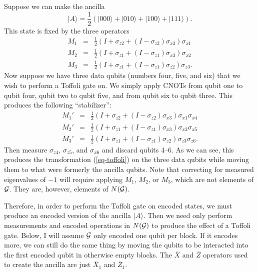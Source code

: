 \documentclass{report}
\newcommand{\G}{{\cal G}}
\newcommand{\ket}[1]{|{#1}\rangle}
\newcommand{\Xs}[1]{\sigma_{x{#1}}}
\newcommand{\Zs}[1]{\sigma_{z{#1}}}
\newcommand{\Xbar}{\overline{X}}
\newcommand{\Zbar}{\overline{Z}}
\begin{document}
Suppose we can make the ancilla
\begin{equation}
\ket{A} = \frac{1}{2} (\ket{000} + \ket{010} + \ket{100} + \ket{111}).
\end{equation}
This state is fixed by the three operators
\begin{eqnarray}
M_1 & = & \frac{1}{2} \left(I + \Zs{2} + (I - \Zs{2}) \Xs{3} \right) \Xs{1}
\nonumber \\
M_2 & = & \frac{1}{2} \left(I + \Zs{1} + (I - \Zs{1}) \Xs{3} \right) \Xs{2}
\label{eq-Toffoli-ev} \\
M_3 & = & \frac{1}{2} \left(I + \Zs{1} + (I - \Zs{1}) \Zs{2} \right) \Zs{3}. 
\nonumber
\end{eqnarray}
Now suppose we have three data qubits (numbers four, five, and six) that we 
wish to perform a Toffoli gate on.  We simply apply CNOTs from qubit one to 
qubit four, qubit two to qubit five, and from qubit six to qubit three.  This 
produces the following ``stabilizer'':
\begin{eqnarray}
M_1' & = & \frac{1}{2} \left(I + \Zs{2} + (I - \Zs{2}) \Xs{3} \right) \Xs{1} 
\Xs{4} \nonumber \\
M_2' & = & \frac{1}{2} \left(I + \Zs{1} + (I - \Zs{1}) \Xs{3} \right) \Xs{2} 
\Xs{5} \\
M_3' & = & \frac{1}{2} \left(I + \Zs{1} + (I - \Zs{1}) \Zs{2} \right) \Zs{3}
\Zs{6}. \nonumber
\end{eqnarray}
Then measure $\Zs{4}$, $\Zs{5}$, and $\Xs{6}$ and discard qubits 4--6.  As we 
can see, this produces the transformation (\ref{eq-toffoli}) on the three 
data qubits while moving them to what were formerly the ancilla qubits.  
Note that correcting for measured eigenvalues of $-1$ will require 
applying $M_1$, $M_2$, or $M_3$, which are not elements of $\G$.  They 
are, however, elements of $N(\G)$.

Therefore, in order to perform the Toffoli gate on encoded states, we must 
produce an encoded version of the ancilla $\ket{A}$.  Then we need only 
perform measurements and encoded operations in $N(\G)$ to produce the 
effect of a Toffoli gate.  Below, I will assume $\G$ only encoded one qubit 
per block.  If it encodes more, we can still do the same thing by moving the 
qubits to be interacted into the first encoded qubit in otherwise empty 
blocks.  The $\Xbar$ and $\Zbar$ operators used to create the ancilla are 
just $\Xbar_1$ and $\Zbar_1$.
\end{document}

